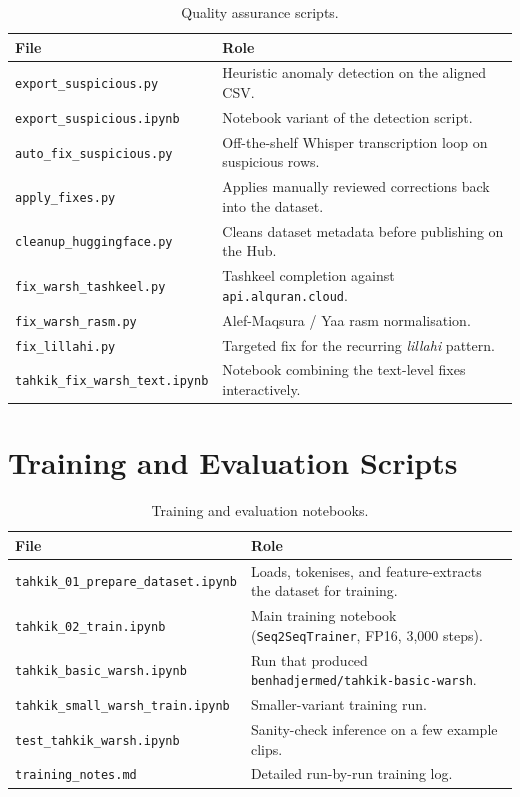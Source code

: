 \documentclass[12pt,a4paper]{report}
\begin{document}
\begin{table}[H]
  \centering
  \caption{Quality assurance scripts.}
  \label{tab:mt_app_qa}
  \renewcommand{\arraystretch}{1.3}
  \begin{tabular}{lp{8cm}}
    \toprule
    \textbf{File} & \textbf{Role} \\
    \midrule
    \texttt{export\_suspicious.py}      & Heuristic anomaly detection on the aligned CSV. \\
    \texttt{export\_suspicious.ipynb}   & Notebook variant of the detection script. \\
    \texttt{auto\_fix\_suspicious.py}   & Off-the-shelf Whisper transcription loop on suspicious rows. \\
    \texttt{apply\_fixes.py}            & Applies manually reviewed corrections back into the dataset. \\
    \texttt{cleanup\_huggingface.py}    & Cleans dataset metadata before publishing on the Hub. \\
    \texttt{fix\_warsh\_tashkeel.py}    & Tashkeel completion against \texttt{api.alquran.cloud}. \\
    \texttt{fix\_warsh\_rasm.py}        & Alef-Maqsura / Yaa rasm normalisation. \\
    \texttt{fix\_lillahi.py}            & Targeted fix for the recurring \emph{lillahi} pattern. \\
    \texttt{tahkik\_fix\_warsh\_text.ipynb} & Notebook combining the text-level fixes interactively. \\
    \bottomrule
  \end{tabular}
\end{table}

\section{Training and Evaluation Scripts}

\begin{table}[H]
  \centering
  \caption{Training and evaluation notebooks.}
  \label{tab:mt_app_training}
  \renewcommand{\arraystretch}{1.3}
  \begin{tabular}{lp{8cm}}
    \toprule
    \textbf{File} & \textbf{Role} \\
    \midrule
    \texttt{tahkik\_01\_prepare\_dataset.ipynb}  & Loads, tokenises, and feature-extracts the dataset for training. \\
    \texttt{tahkik\_02\_train.ipynb}             & Main training notebook (\texttt{Seq2SeqTrainer}, FP16, 3{,}000 steps). \\
    \texttt{tahkik\_basic\_warsh.ipynb}          & Run that produced \texttt{benhadjermed/tahkik-basic-warsh}. \\
    \texttt{tahkik\_small\_warsh\_train.ipynb}   & Smaller-variant training run. \\
    \texttt{test\_tahkik\_warsh.ipynb}           & Sanity-check inference on a few example clips. \\
    \texttt{training\_notes.md}                  & Detailed run-by-run training log. \\
    \bottomrule
  \end{tabular}
\end{table}
\end{document}
